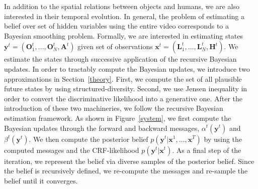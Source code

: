 In addition to the spatial relations between objects and humans, we are also interested in their temporal evolution. In general, the problem of estimating a belief over set of hidden variables using the entire video corresponds to a Bayesian smoothing problem. Formally, we are interested in estimating states \mbox{$\mathbf{y}^t=(\mathbf{O}_1^t,\ldots,\mathbf{O}_N^t,\mathbf{A}^t)$} given set of observations \mbox{$\mathbf{x}^t=(\mathbf{L}_1^t,\ldots,\mathbf{L}_N^t,\mathbf{H}^t)$}. We estimate the states through successive application of the recursive Bayesian updates. In order to tractably compute the Bayesian updates, we introduce two approximations in Section~\ref{theory}. First, we compute the set of all plausible future states by using structured-diversity. Second, we use Jensen inequality in order to convert the discriminative likelihood into a generative one. After the introduction of these two machineries, we follow the recursive Bayesian estimation framework. As shown in Figure~\ref{system}, we first compute the Bayesian updates through the forward and backward messages, $\alpha^t(\mathbf{y}^t)$ and $\beta^{t}(\mathbf{y}^{t})$. We then compute the posterior belief $p(\mathbf{y}^t|\mathbf{x}^1,\ldots,\mathbf{x}^T)$ by using the computed messages and the CRF-likelihood \emph{$p(\mathbf{y}^t|\mathbf{x}^t)$}. As a final step of the iteration, we represent the belief via diverse samples of the posterior belief. Since the belief is recursively defined, we re-compute the messages and re-sample the belief until it converges.

